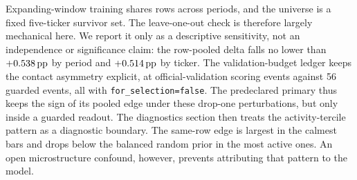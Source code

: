 Expanding-window training shares rows across periods, and the universe is a fixed
five-ticker survivor set. The leave-one-out check is therefore largely mechanical
here. We report it only as a descriptive sensitivity, not an independence or
significance claim: the row-pooled delta falls no lower than \(+0.538\,\textrm{pp}\) by
period and \(+0.514\,\textrm{pp}\) by ticker. The validation-budget ledger keeps the contact asymmetry
explicit, at \numseeds{} official-validation scoring events against 56 guarded
events, all with \texttt{for\_selection=false}. The predeclared primary thus
keeps the sign of its pooled edge under these drop-one perturbations, but only
inside a guarded readout. The diagnostics section then
treats the activity-tercile pattern as a diagnostic boundary. The same-row
edge is largest in the calmest bars and drops below the balanced random prior in
the most active ones. An open microstructure confound, however, prevents attributing
that pattern to the model.
